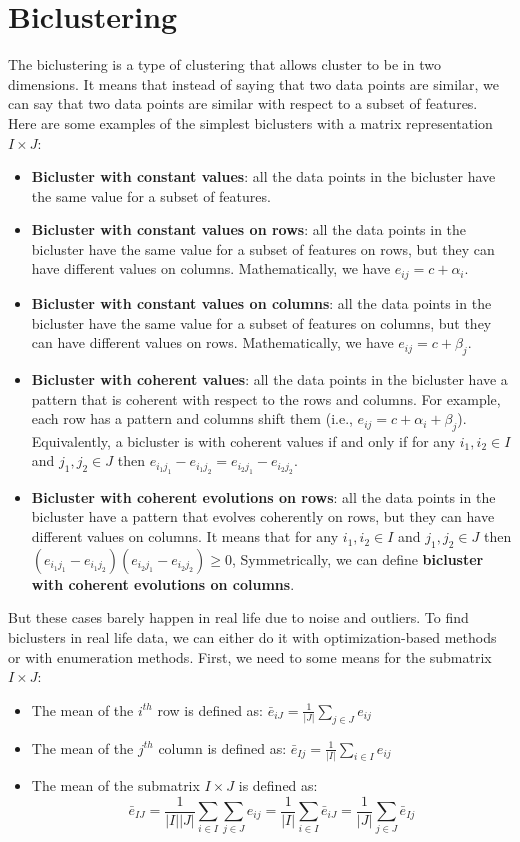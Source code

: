 \documentclass[12pt, openany]{report}
\theoremstyle{definition}
\begin{document}
\section{Biclustering}
The biclustering is a type of clustering that allows cluster to be in two dimensions. It means that instead of saying that two data points are similar, we can say that two data points are similar with respect to a subset of features. \\
Here are some examples of the simplest biclusters with a matrix representation $I \times J$:
\begin{itemize}
    \item \textbf{Bicluster with constant values}: all the data points in the bicluster have the same value for a subset of features.
    \item \textbf{Bicluster with constant values on rows}: all the data points in the bicluster have the same value for a subset of features on rows, but they can have different values on columns. Mathematically, we have $e_{ij} = c+\alpha_i$.
    \item \textbf{Bicluster with constant values on columns}: all the data points in the bicluster have the same value for a subset of features on columns, but they can have different values on rows. Mathematically, we have $e_{ij} = c+\beta_j$.
    \item \textbf{Bicluster with coherent values}: all the data points in the bicluster have a pattern that is coherent with respect to the rows and columns. For example, each row has a pattern and columns shift them (i.e., $e_{ij} = c+\alpha_i+\beta_j$). Equivalently, a bicluster is with coherent values if and only if for any $i_1,i_2 \in I$ and $j_1,j_2 \in J$ then $e_{i_1 j_1} - e_{i_1 j_2} = e_{i_2 j_1} - e_{i_2 j_2}$.
    \item \textbf{Bicluster with coherent evolutions on rows}: all the data points in the bicluster have a pattern that evolves coherently on rows, but they can have different values on columns. It means that for any $i_1,i_2 \in I$ and $j_1,j_2 \in J$ then $(e_{i_1 j_1} - e_{i_1 j_2})(e_{i_2 j_1} - e_{i_2 j_2}) \geq 0$, Symmetrically, we can define \textbf{bicluster with coherent evolutions on columns}.
\end{itemize}
But these cases barely happen in real life due to noise and outliers. To find biclusters in real life data, we can either do it with optimization-based methods or with enumeration methods. 
First, we need to some means for the submatrix $I \times J$:
\begin{itemize}
    \item The mean of the $i^{th}$ row is defined as: $\bar{e}_{iJ} = \frac{1}{|J|} \sum_{j \in J} e_{ij}$
    \item The mean of the $j^{th}$ column is defined as: $\bar{e}_{Ij} = \frac{1}{|I|} \sum_{i \in I} e_{ij}$
    \item The mean of the submatrix $I \times J$ is defined as:
    \begin{equation}    
        \bar{e}_{IJ} = \frac{1}{|I||J|} \sum_{i \in I} \sum_{j \in J} e_{ij} = \frac{1}{|I|} \sum_{i \in I} \bar{e}_{iJ} = \frac{1}{|J|} \sum_{j \in J} \bar{e}_{Ij}
    \end{equation}
\end{itemize}
\end{document}
